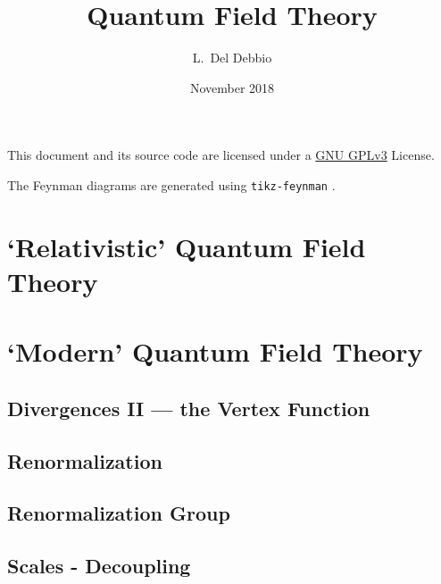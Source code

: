 \documentclass[bibliography=totoc]{notes}
\title{Quantum Field Theory}
\author{L.~Del Debbio}
\date{November 2018}
\begin{document}
%
\maketitle
\clearpage
\tableofcontents

\vspace{\fill}

This document and its source code are licensed under a \href{https://www.gnu.org/licenses/gpl-3.0.en.html}{GNU GPLv3} License.

The Feynman diagrams are generated using \texttt{tikz-feynman} \parencite{ELLIS2017103}.

\nocite{*}
\printbibliography[keyword=recommended,title={Recommended Textbooks},omitnumbers=true]



\part{`Relativistic' Quantum Field Theory}
\label{part:RQFT}


\part{`Modern' Quantum Field Theory}
\label{part:MQFT}



%






\chapter{Divergences II --- the Vertex Function}
\label{cha:diverg-ii-vert}


\chapter{Renormalization}
\label{cha:renormalization}
% 


\chapter{Renormalization Group}
\label{cha:renorm-group}

\chapter{Scales - Decoupling}
\label{cha:scales-decoupling}

\printindex
\printbibliography[notkeyword=recommended]
\end{document}
